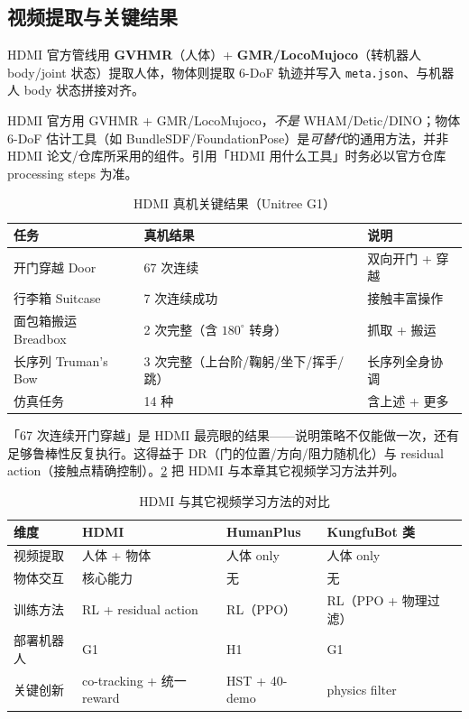 \subsection{视频提取与关键结果}
\label{sec:rlmc-mm-hdmi-result}

HDMI 官方管线用 \textbf{GVHMR}（人体）+ \textbf{GMR/LocoMujoco}（转机器人 body/joint 状态）提取人体，物体则提取 6-DoF 轨迹并写入 \verb|meta.json|、与机器人 body 状态拼接对齐。

\begin{note}
HDMI 官方用 GVHMR + GMR/LocoMujoco，\emph{不是} WHAM/Detic/DINO；物体 6-DoF 估计工具（如 BundleSDF/FoundationPose）是\emph{可替代}的通用方法，并非 HDMI 论文/仓库所采用的组件。引用「HDMI 用什么工具」时务必以官方仓库 processing steps 为准。
\end{note}

\begin{table}[ht]
\centering
\small
\caption{HDMI 真机关键结果（Unitree G1）}
\label{tab:rlmc-mm-hdmi-result}
\begin{tabular}{@{}lll@{}}
\toprule
任务 & 真机结果 & 说明 \\
\midrule
开门穿越 Door & 67 次连续 & 双向开门 + 穿越 \\
行李箱 Suitcase & 7 次连续成功 & 接触丰富操作 \\
面包箱搬运 Breadbox & 2 次完整（含 $180^\circ$ 转身） & 抓取 + 搬运 \\
长序列 Truman's Bow & 3 次完整（上台阶/鞠躬/坐下/挥手/跳） & 长序列全身协调 \\
仿真任务 & 14 种 & 含上述 + 更多 \\
\bottomrule
\end{tabular}
\end{table}

「67 次连续开门穿越」是 HDMI 最亮眼的结果——说明策略不仅能做一次，还有足够鲁棒性反复执行。这得益于 DR（门的位置/方向/阻力随机化）与 residual action（接触点精确控制）。\cref{tab:rlmc-mm-hdmi-compare} 把 HDMI 与本章其它视频学习方法并列。

\begin{table}[ht]
\centering
\small
\caption{HDMI 与其它视频学习方法的对比}
\label{tab:rlmc-mm-hdmi-compare}
\begin{tabular}{@{}llll@{}}
\toprule
维度 & HDMI & HumanPlus & KungfuBot 类 \\
\midrule
视频提取 & 人体 + 物体 & 人体 only & 人体 only \\
物体交互 & 核心能力 & 无 & 无 \\
训练方法 & RL + residual action & RL（PPO） & RL（PPO + 物理过滤） \\
部署机器人 & G1 & H1 & G1 \\
关键创新 & co-tracking + 统一 reward & HST + 40-demo & physics filter \\
\bottomrule
\end{tabular}
\end{table}

